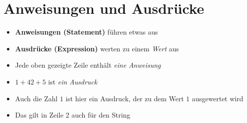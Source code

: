 


\section{Anweisungen und Ausdrücke}
\begin{frame}
    \slidehead
    \begin{itemize}
        \item \textbf{Anweisungen (Statement)} führen etwas aus
        \item \textbf{Ausdrücke (Expression)} werten zu einem \textit{Wert} aus
    \end{itemize}
    \pause
    \begin{itemize}
        \item Jede oben gezeigte Zeile enthält \textit{eine Anweisung}
        \item $1 + 42 + 5$ ist \textit{ein Ausdruck}
            \pause
        \item Auch die Zahl $1$ ist hier ein Ausdruck, der zu dem Wert $1$ ausgewertet wird
        \item Das gilt in Zeile 2 auch für den String
    \end{itemize}

\end{frame}




